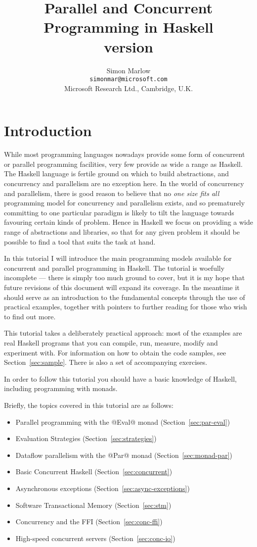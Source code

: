 \documentclass[11pt,a4paper]{article}
\title{Parallel and Concurrent Programming in Haskell
  \\ \normalsize{version \version}}
\author{Simon Marlow\\\texttt{simonmar@microsoft.com}\\Microsoft Research Ltd., Cambridge, U.K.}
\newcommand{\Section}[2]{\section{#2}\label{sec:#1}}
\newcommand{\secref}[1]{Section~\ref{sec:#1}}
\begin{document}
\maketitle
\makeatactive

\tableofcontents


\Section{intro}{Introduction}

While most programming languages nowadays provide some form of
concurrent or parallel programming facilities, very few provide as
wide a range as Haskell.  The Haskell language is fertile ground on
which to build abstractions, and concurrency and parallelism are no
exception here.  In the world of concurrency and parallelism, there is
good reason to believe that no \emph{one size fits all} programming
model for concurrency and parallelism exists, and so prematurely
committing to one particular paradigm is likely to tilt the language
towards favouring certain kinds of problem.  Hence in Haskell we focus
on providing a wide range of abstractions and libraries, so that for
any given problem it should be possible to find a tool that suits the
task at hand.

In this tutorial I will introduce the main programming models
available for concurrent and parallel programming in Haskell.  The
tutorial is woefully incomplete --- there is simply too much ground to
cover, but it is my hope that future revisions of this document will
expand its coverage.  In the meantime it should serve as an
introduction to the fundamental concepts through the use of practical
examples, together with pointers to further reading for those who wish
to find out more.

This tutorial takes a deliberately practical approach: most of the
examples are real Haskell programs that you can compile, run, measure,
modify and experiment with.  For information on how to obtain the code
samples, see \secref{sample}.  There is also a set of accompanying
exercises.

In order to follow this tutorial you should have a basic knowledge of
Haskell, including programming with monads.

Briefly, the topics covered in this tutorial are as follows:

\begin{itemize}
\item Parallel programming with the @Eval@ monad (\secref{par-eval})
\item Evaluation Strategies (\secref{strategies})
\item Dataflow parallelism with the @Par@ monad (\secref{monad-par})
\item Basic Concurrent Haskell (\secref{concurrent})
\item Asynchronous exceptions (\secref{async-exceptions})
\item Software Transactional Memory (\secref{stm})
\item Concurrency and the FFI (\secref{conc-ffi})
\item High-speed concurrent servers (\secref{conc-io})
\end{itemize}
\end{document}
